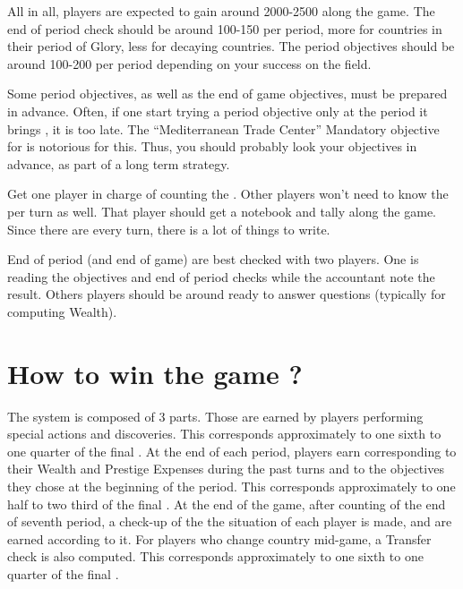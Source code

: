 \begin{designnote}
  All in all, players are expected to gain around 2000-2500 \VPs along the
  game. The end of period check should be around 100-150 \VPs per period, more
  for countries in their period of Glory, less for decaying countries. The
  period objectives should be around 100-200 \VPs per period depending on your
  success on the field.
\end{designnote}

\begin{playtip}
  Some period objectives, as well as the end of game objectives, must be
  prepared in advance. Often, if one start trying a period objective only at
  the period it brings \VPs, it is too late. The ``Mediterranean Trade
  Center'' Mandatory objective for \FRA is notorious for this. Thus, you
  should probably look your objectives in advance, as part of a long term
  strategy.
\end{playtip}

\begin{playtip}
  Get one player in charge of counting the \VPs. Other players won't need to
  know the \VPs per turn as well. That player should get a notebook and tally
  \VPs along the game. Since there are \VPs every turn, there is a lot of
  things to write.

  End of period (and end of game) \VPs are best checked with two players. One
  is reading the objectives and end of period checks while the \VPs accountant
  note the result. Others players should be around ready to answer questions
  (typically for computing Wealth).
\end{playtip}

\section{How to win the game ?}

\aparag The \VP system is composed of 3 parts.
Those \VPs are earned by players performing special actions and
discoveries. This corresponds approximately to one sixth to one quarter of the
final \VPs.
At the end of each period, players earn \VPs corresponding to their Wealth and
Prestige Expenses during the past turns and to the objectives they chose at
the beginning of the period. This corresponds approximately to one half to two
third of the final \VPs.
At the end of the game, after counting \VPs of the end of seventh period, a
check-up of the the situation of each player is made, and \VPs are earned
according to it. For players who change country mid-game, a Transfer check is
also computed. This corresponds approximately to one sixth to one quarter of
the final \VPs.




